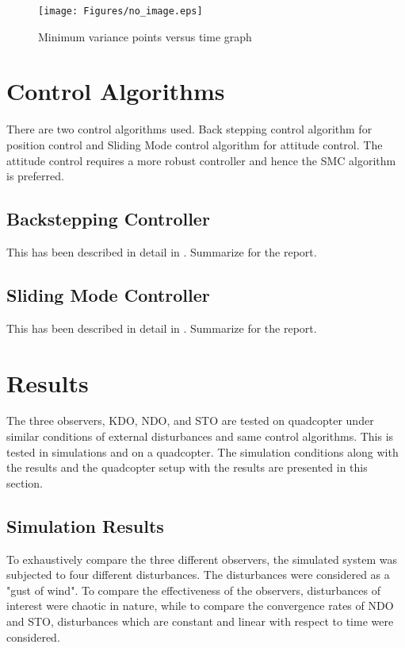 \documentclass{article}
\begin{document}
\begin{figure}[H]
\centering
\texttt{[image: Figures/no\_image.eps]}
\caption{Minimum variance points versus time graph}
\label{quad_red_balls}
\end{figure}

\section{Control Algorithms}
There are two control algorithms used. Back stepping control algorithm for position control and Sliding Mode control algorithm for attitude control. The attitude control requires a more robust controller and hence the SMC algorithm is preferred. 






\subsection{Backstepping Controller}
This has been described in detail in \cite{fethalla2017backstepping}. Summarize for the report.


\subsection{Sliding Mode Controller}
This has been described in detail in \cite{fethalla2018sliding}. Summarize for the report.





\section{Results}
The three observers, KDO, NDO, and STO are tested on quadcopter under similar conditions of external disturbances and same control algorithms. This is tested in simulations and on a quadcopter. The simulation conditions along with the results and the quadcopter setup with the results are presented in this section. 

\subsection{Simulation Results}
To exhaustively compare the three different observers, the simulated system was subjected to four different disturbances. The disturbances were considered as a "gust of wind". To compare the effectiveness of the observers, disturbances of interest were chaotic in nature, while to compare the convergence rates of NDO and STO, disturbances which are constant and linear with respect to time were considered. 
\end{document}
